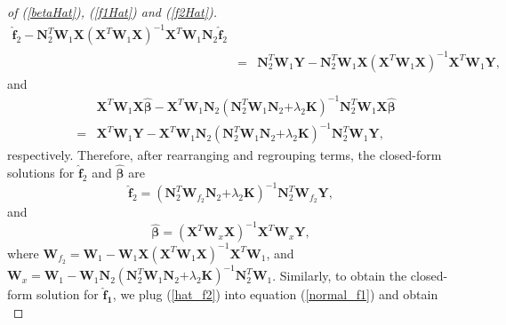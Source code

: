 \documentclass[article,lineno]{biometrika}
\begin{document}
\begin{proof} [of (\ref{betaHat}),  (\ref{f1Hat}) and  (\ref{f2Hat})]
\begin{eqnarray*}
\boldsymbol {\hat f}_2
-
\boldsymbol N_2^T  \boldsymbol W_1
\boldsymbol X 
(\boldsymbol X^T  \boldsymbol W_1\boldsymbol X)^{-1}  
\boldsymbol X^T  \boldsymbol W_1
\boldsymbol N_2 \boldsymbol {\hat f}_2 \\
&=&
\boldsymbol N_2^T  \boldsymbol W_1
\boldsymbol Y - \boldsymbol N_2^T  \boldsymbol W_1
\boldsymbol X 
(\boldsymbol X^T  \boldsymbol W_1\boldsymbol X)^{-1}  
\boldsymbol X^T  \boldsymbol W_1
\boldsymbol Y,
\end{eqnarray*}
and
\begin{eqnarray*}
&&
\boldsymbol X^T  \boldsymbol W_1
\boldsymbol X \boldsymbol {\hat \beta} 
- 
\boldsymbol X^T  \boldsymbol W_1
\boldsymbol N_2  
(\boldsymbol N_2^T  \boldsymbol W_1 \boldsymbol N_2 \boldsymbol 
 + \lambda_2 \boldsymbol K)^{-1}
  \boldsymbol N_2^T  \boldsymbol W_1 \boldsymbol X \boldsymbol {\hat \beta} \\
&=& 
\boldsymbol X^T  \boldsymbol W_1
\boldsymbol Y
-
\boldsymbol X^T  \boldsymbol W_1
\boldsymbol N_2  
(\boldsymbol N_2^T  \boldsymbol W_1 \boldsymbol N_2 \boldsymbol 
 + \lambda_2 \boldsymbol K)^{-1}
  \boldsymbol N_2^T  \boldsymbol W_1 \boldsymbol Y,
\end{eqnarray*}
respectively.
Therefore, after rearranging and regrouping terms, the closed-form solutions for $ \boldsymbol {\hat f}_2 $ and $\boldsymbol {\hat \beta}$ are
$$
 \boldsymbol {\hat f}_2 
 =  (\boldsymbol N_2^T  \boldsymbol W_{f_2} \boldsymbol N_2 \boldsymbol 
 + \lambda_2 \boldsymbol K)^{-1}
  \boldsymbol N_2^T  \boldsymbol W_{f_2} \boldsymbol Y,
$$
and
$$
\boldsymbol {\hat \beta} 
 = 
 (\boldsymbol X^T  \boldsymbol W_x \boldsymbol X )^{-1} \boldsymbol X^T  \boldsymbol W_x \boldsymbol Y,
$$
where  
$\boldsymbol W_{f_2}  =  \boldsymbol W_1 - \boldsymbol W_1\boldsymbol X(\boldsymbol X^T  \boldsymbol W_1\boldsymbol X)^{-1}  \boldsymbol X^T  \boldsymbol W_1$,
and
$\boldsymbol W_x =
 \boldsymbol W_1 
 -
\boldsymbol W_1 \boldsymbol N_2 
 (\boldsymbol N_2^T  \boldsymbol W_1 \boldsymbol N_2 \boldsymbol 
 + \lambda_2 \boldsymbol K)^{-1} 
 \boldsymbol N_2^T  \boldsymbol W_1$.
Similarly, to obtain the closed-form solution for $\boldsymbol {\hat f_1}$, we plug  (\ref{hat_f2}) into equation (\ref{normal_f1}) and obtain
\begin{equation} \label{normal_new_f1}

\end{equation}
\end{proof}
\end{document}
